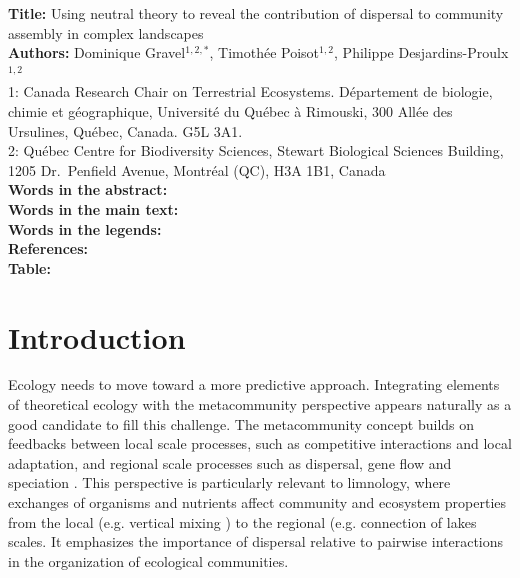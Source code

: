 \documentclass[12pt]{article}
\begin{document}
\linenumbers 
\modulolinenumbers[1]

\textbf{Title:}   Using neutral theory to reveal the contribution of dispersal to community assembly in complex landscapes\\

\textbf{Authors:}  Dominique Gravel$^{1,2,*}$, Timoth\'ee Poisot$^{1,2}$, Philippe Desjardins-Proulx$^{1,2}$\\

1: Canada Research Chair on Terrestrial Ecosystems. D\'epartement de biologie, chimie et g\'eographique, Universit\'e du Qu\'ebec \`a Rimouski, 300 All\'ee des Ursulines, Qu\'ebec, Canada. G5L 3A1.\\

2: Qu\'ebec Centre for Biodiversity Sciences, Stewart Biological Sciences Building, 1205 Dr.~Penfield Avenue, Montr\'eal (QC), H3A 1B1, Canada\\

\textbf{Words in the abstract:}      \\
\textbf{Words in the main text:}    \\
\textbf{Words in the legends:}    \\
\textbf{References:}             \\
\textbf{Table:}                    \\

\newpage
\doublespacing

\section{Introduction}

Ecology needs to move toward a more predictive approach. Integrating
elements of theoretical ecology \parencite{Thuiller2013} with the metacommunity
perspective appears naturally as a good candidate to fill this challenge. The metacommunity
concept builds on feedbacks between local scale processes, such as competitive
interactions and local adaptation, and regional scale processes such as
dispersal, gene flow and speciation \textcite{Leibold2004a}. This perspective is
particularly relevant to limnology, where exchanges of organisms and nutrients
affect community and ecosystem properties from the local (e.g. vertical mixing
\parencite{Ryabov2011}) to the regional (e.g. connection of lakes
\parencite{Leibold2004b} scales. It emphasizes the importance of dispersal
relative to pairwise interactions in the organization of ecological communities.
\end{document}
